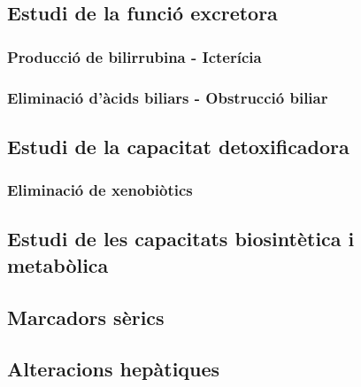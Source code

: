 \subsection{Estudi de la funció excretora}
\label{sec:estudi-de-la}

\subsubsection{Producció de bilirrubina - Icterícia}
\label{sec:prod-de-bilirr}


\subsubsection{Eliminació d'àcids biliars - Obstrucció biliar}
\label{sec:elim-dacids-bili}


\subsection{Estudi de la capacitat detoxificadora}
\label{sec:estudi-de-la-1}

\subsubsection{Eliminació de xenobiòtics}
\label{sec:elim-de-xenob}


\subsection{Estudi de les capacitats biosintètica i metabòlica}
\label{sec:estudi-de-les}


\subsection{Marcadors sèrics}
\label{sec:marcadors-serics}


\subsection{Alteracions hepàtiques}
\label{sec:alter-hepat}


